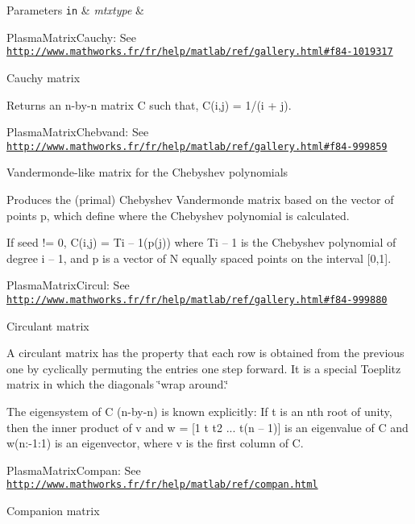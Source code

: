 \begin{DoxyParams}[1]{Parameters}
\mbox{\tt in}  & {\em mtxtype} & \begin{DoxyItemize}
\item Plasma\+Matrix\+Cauchy\+: See \href{http://www.mathworks.fr/fr/help/matlab/ref/gallery.html#f84-1019317}{\tt http\+://www.\+mathworks.\+fr/fr/help/matlab/ref/gallery.\+html\#f84-\/1019317}\end{DoxyItemize}
Cauchy matrix\\
\hline
\end{DoxyParams}
Returns an n-\/by-\/n matrix C such that, C(i,j) = 1/(i + j).

\begin{DoxyItemize}
\item Plasma\+Matrix\+Chebvand\+: See \href{http://www.mathworks.fr/fr/help/matlab/ref/gallery.html#f84-999859}{\tt http\+://www.\+mathworks.\+fr/fr/help/matlab/ref/gallery.\+html\#f84-\/999859}\end{DoxyItemize}
Vandermonde-\/like matrix for the Chebyshev polynomials

Produces the (primal) Chebyshev Vandermonde matrix based on the vector of points p, which define where the Chebyshev polynomial is calculated.

If seed != 0, C(i,j) = Ti – 1(p(j)) where Ti – 1 is the Chebyshev polynomial of degree i – 1, and p is a vector of N equally spaced points on the interval \mbox{[}0,1\mbox{]}.

\begin{DoxyItemize}
\item Plasma\+Matrix\+Circul\+: See \href{http://www.mathworks.fr/fr/help/matlab/ref/gallery.html#f84-999880}{\tt http\+://www.\+mathworks.\+fr/fr/help/matlab/ref/gallery.\+html\#f84-\/999880}\end{DoxyItemize}
Circulant matrix

A circulant matrix has the property that each row is obtained from the previous one by cyclically permuting the entries one step forward. It is a special Toeplitz matrix in which the diagonals \char`\"{}wrap around.\char`\"{}

The eigensystem of C (n-\/by-\/n) is known explicitly\+: If t is an nth root of unity, then the inner product of v and w = \mbox{[}1 t t2 ... t(n – 1)\mbox{]} is an eigenvalue of C and w(n\+:-\/1\+:1) is an eigenvector, where v is the first column of C.

\begin{DoxyItemize}
\item Plasma\+Matrix\+Compan\+: See \href{http://www.mathworks.fr/fr/help/matlab/ref/compan.html}{\tt http\+://www.\+mathworks.\+fr/fr/help/matlab/ref/compan.\+html}\end{DoxyItemize}
Companion matrix

